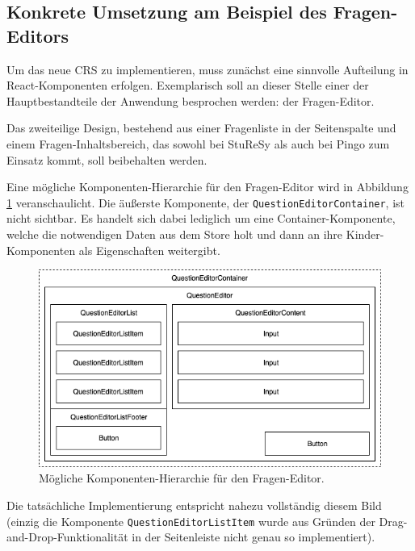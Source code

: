 \subsection{Konkrete Umsetzung am Beispiel des Fragen-Editors}
Um das neue CRS zu implementieren, muss zunächst eine sinnvolle Aufteilung in React-Komponenten erfolgen. Exemplarisch soll an dieser Stelle einer der Hauptbestandteile der Anwendung besprochen werden: der Fragen-Editor.

Das zweiteilige Design, bestehend aus einer Fragenliste in der Seitenspalte und einem Fragen-Inhaltsbereich, das sowohl bei StuReSy als auch bei Pingo zum Einsatz kommt, soll beibehalten werden.

Eine mögliche Komponenten-Hierarchie für den Fragen-Editor wird in Abbildung \ref{abb:komponenten_hierarchie} veranschaulicht. Die äußerste Komponente, der \texttt{QuestionEditorContainer}, ist nicht sichtbar. Es handelt sich dabei lediglich um eine Container-Komponente, welche die notwendigen Daten aus dem Store holt und dann an ihre Kinder-Komponenten als Eigenschaften weitergibt.

\begin{figure}[H]
    \includegraphics[width=\textwidth]{chapter/entwurf/bilder/Component_Hierarchy.png}
    \centering
    \caption[Komponenten-Hierarchie des Fragen-Editors]{Mögliche Komponenten-Hierarchie für den Fragen-Editor.}
    \label{abb:komponenten_hierarchie}
\end{figure}

Die tatsächliche Implementierung entspricht nahezu vollständig diesem Bild (einzig die Komponente \texttt{QuestionEditorListItem} wurde aus Gründen der Drag-and-Drop-Funktionalität in der Seitenleiste nicht genau so implementiert).


